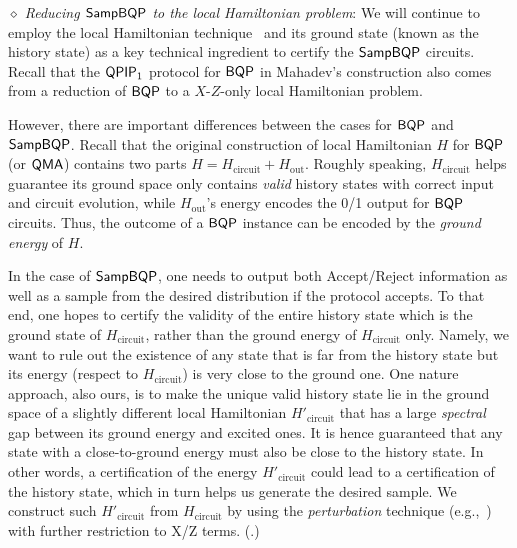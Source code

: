 

\vspace{2mm} \noindent \emph{$\diamond$ Reducing  $\operatorname{\mathsf{SampBQP}}$ to the local Hamiltonian problem}: We will continue to employ the local Hamiltonian technique~\cite{kitaev2002classical} and its ground state (known as the history state) as a key technical ingredient to certify the $\operatorname{\mathsf{SampBQP}}$ circuits. 
Recall that the $\operatorname{\mathsf{QPIP}}_1$ protocol for $\operatorname{\mathsf{BQP}}$ in Mahadev's construction also comes from a reduction of $\operatorname{\mathsf{BQP}}$ to a $X$-$Z$-only local Hamiltonian problem. 

However, there are important differences between the cases for $\operatorname{\mathsf{BQP}}$ and $\operatorname{\mathsf{SampBQP}}$. Recall that the original construction of local Hamiltonian $H$ for $\operatorname{\mathsf{BQP}}$ (or $\operatorname{\mathsf{QMA}}$) contains two parts $H=H_{\mathrm{circuit}}+ H_{\mathrm{out}}$.
Roughly speaking, $H_{\mathrm{circuit}}$ helps guarantee its ground space only contains \emph{valid} history states with correct input and circuit evolution, while $H_{\mathrm{out}}$'s energy encodes the 0/1 output for $\operatorname{\mathsf{BQP}}$ circuits.
Thus, the outcome of a $\operatorname{\mathsf{BQP}}$ instance can be encoded by the \emph{ground energy} of $H$.

In the case of $\operatorname{\mathsf{SampBQP}}$, one needs to output both Accept/Reject information as well as a sample from the desired distribution if the protocol accepts. 
To that end, one hopes to certify the validity of the entire history state which is the ground state of $H_{\mathrm{circuit}}$, rather than the ground energy of $H_{\mathrm{circuit}}$ only. 
Namely, we want to rule out the existence of any state that is far from the history state but its energy (respect to $H_{\mathrm{circuit}}$) is very close to the ground one. 
One nature approach, also ours, is to make the unique valid history state lie in the ground space of a slightly different local Hamiltonian $H'_{\mathrm{circuit}}$ that has a large \emph{spectral} gap between its ground energy and excited ones.
It is hence guaranteed that any state with a close-to-ground energy must also be close to the history state.
In other words, a certification of the energy $H'_{\mathrm{circuit}}$ could lead to a certification of the history state, which in turn helps us generate the desired sample. 
We construct such $H'_{\mathrm{circuit}}$ from $H_{\mathrm{circuit}}$ by using the \emph{perturbation} technique (e.g.,~\cite{kempe_kitaev_regev_2006}) with further restriction to X/Z terms. (.)

